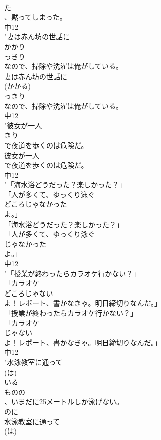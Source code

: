 \documentclass[8pt]{extreport}
\begin{document}
\begin{CJK}{UTF8}{min}
\\	た
\\	、黙ってしまった。
\\	中12
\\	"妻は赤ん坊の世話に
\\	かかり
\\	っきり
\\	なので、掃除や洗濯は俺がしている。
\\	妻は赤ん坊の世話に
\\	(かかる)
\\	っきり
\\	なので、掃除や洗濯は俺がしている。
\\	中12
\\	"彼女が一人
\\	きり
\\	で夜道を歩くのは危険だ。
\\	彼女が一人
\\	で夜道を歩くのは危険だ。
\\	中12
\\	"「海水浴どうだった？楽しかった？」
\\	「人が多くて、ゆっくり泳ぐ
\\	どころじゃなかった
\\	よ。」
\\	「海水浴どうだった？楽しかった？」
\\	「人が多くて、ゆっくり泳ぐ
\\	じゃなかった
\\	よ。」
\\	中12
\\	"「授業が終わったらカラオケ行かない？」
\\	「カラオケ
\\	どころじゃない
\\	よ！レポート、書かなきゃ。明日締切りなんだ。」
\\	「授業が終わったらカラオケ行かない？」
\\	「カラオケ
\\	じゃない
\\	よ！レポート、書かなきゃ。明日締切りなんだ。」
\\	中12
\\	"水泳教室に通って
\\	(は)
\\	いる
\\	ものの
\\	、いまだに25メートルしか泳げない。
\\	のに 
\\	水泳教室に通って
\\	(は)

\end{CJK}
\end{document}
